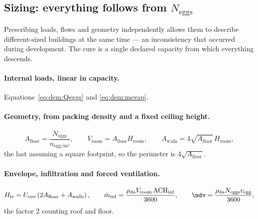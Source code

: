 \subsection{Sizing: everything follows from \texorpdfstring{$N_{\mathrm{eggs}}$}{N\_eggs}}
\label{sec:dem:sizing}

Prescribing loads, flows and geometry independently allows them to describe
different-sized buildings at the same time --- an inconsistency that occurred
during development. The cure is a single declared capacity from which everything
descends.

\paragraph{Internal loads, linear in capacity.}
Equations~\eqref{eq:dem:Qeggs} and \eqref{eq:dem:mevap}.

\paragraph{Geometry, from packing density and a fixed ceiling height.}
\begin{equation}
A_{\mathrm{floor}}=\frac{N_{\mathrm{eggs}}}{n_{\mathrm{egg/m^2}}},\qquad
V_{\mathrm{room}}=A_{\mathrm{floor}}H_{\mathrm{room}},\qquad
A_{\mathrm{walls}}=4\sqrt{A_{\mathrm{floor}}}\,H_{\mathrm{room}},
\label{eq:dem:geom}
\end{equation}
the last assuming a square footprint, so the perimeter is
$4\sqrt{A_{\mathrm{floor}}}$.

\paragraph{Envelope, infiltration and forced ventilation.}
\begin{equation}
H_{\mathrm{tr}}=U_{\mathrm{env}}\left(2A_{\mathrm{floor}}+A_{\mathrm{walls}}\right),
\qquad
\dot m_{\mathrm{inf}}=\frac{\rho_{\mathrm{da}}V_{\mathrm{room}}\,\mathrm{ACH}_{\mathrm{inf}}}{3600},
\qquad
\mdv=\frac{\rho_{\mathrm{da}}N_{\mathrm{eggs}}v_{\mathrm{egg}}}{3600},
\label{eq:dem:Htr}
\end{equation}
the factor $2$ counting roof and floor.

